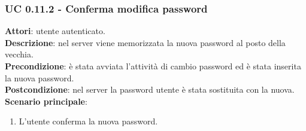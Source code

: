 	\subsubsection{UC 0.11.2 - Conferma modifica password}{
		\label{uc0.11.2}
		\textbf{Attori}: utente autenticato.\\
		\textbf{Descrizione}: nel server viene memorizzata la nuova password al posto della vecchia. \\
		\textbf{Precondizione}: è stata avviata l'attività di cambio password ed è stata inserita la nuova password.	\\
		\textbf{Postcondizione}: nel server la password utente è stata sostituita con la nuova.	\\
		\textbf{Scenario principale}:
		\begin{enumerate}
			\item L'utente conferma la nuova password.
		\end{enumerate}		
		}